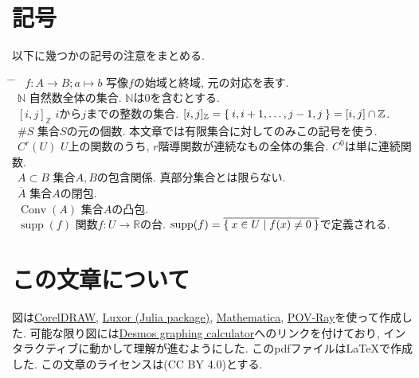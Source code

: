\documentclass{jsarticle}
\newcommand\setN{\mathbb{N}}
\newcommand\setZ{\mathbb{Z}}
\newcommand\setR{\mathbb{R}}
\newcommand\Cl[1]{\overline{#1}}
\newcommand\squa[1]{[#1]}
\newcommand\Squa[1]{\left[#1\right]}
\newcommand\Z[2]{\squa{#1,#2}_\mathbb{Z}}
\DeclareMathOperator{\supp}{supp}
\DeclareMathOperator*{\conv}{Conv}
\theoremstyle{definition}%
\begin{document}
\section*{記号}
以下に幾つかの記号の注意をまとめる.
\begin{tabbing}
    \hspace{5.2mm} \= \hspace{35mm} \= \hspace{1000mm} \kill
    \>  \, $f:A\to B;a\mapsto b$ \> 写像$f$の始域と終域, 元の対応を表す. \\
    \>  \, $\setN$ \> 自然数全体の集合. $\setN$は$0$を含むとする. \\
    \>  \, $\Z{i}{j}$ \> $i$から$j$までの整数の集合. $\Z{i}{j}=\Set{i,i+1,\dots,j-1,j}=\Squa{i,j}\cap\setZ$. \\
    \>  \, $\#S$ \> 集合$S$の元の個数. 本文章では有限集合に対してのみこの記号を使う. \\
    \>  \, $C^{r}(U)$ \> $U$上の関数のうち, $r$階導関数が連続なもの全体の集合. $C^0$は単に連続関数. \\
    \>  \, $A\subset B$ \> 集合$A,B$の包含関係. 真部分集合とは限らない. \\
    \>  \, $\Cl{A}$ \> 集合$A$の閉包. \\
    \>  \, $\conv(A)$ \> 集合$A$の凸包. \\
    \>  \, $\supp(f)$ \> 関数$f:U\to\setR$の台. $\supp(f)=\Cl{\Set{x\in U|f(x)\neq 0}}$で定義される.
\end{tabbing}



\section*{この文章について}
図は\href{https://www.coreldraw.com}{CorelDRAW}, \href{https://juliagraphics.github.io/Luxor.jl/stable/}{Luxor (Julia package)}, \href{https://www.wolfram.com/mathematica/}{Mathematica}, \href{http://www.povray.org/}{POV-Ray}を使って作成した.
可能な限り図には\href{https://www.desmos.com/}{Desmos graphing calculator}へのリンクを付けており, インタラクティブに動かして理解が進むようにした.
このpdfファイルは\LaTeX で作成した.
この文章のライセンスは(CC BY 4.0)とする.
\doclicenseThis

\tableofcontents

\newpage
{}
\end{document}

